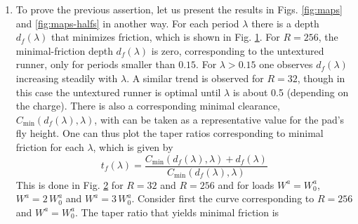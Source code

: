 \begin{enumerate}
Rayleigh step, which is optimal, has a slightly smaller taper ratio of 1.866) but also
for minimizing friction\cite{rahmani09}. 
\begin{figure}[h]
     \begin{center}
     {\scalebox{1.0}{}}
    \end{center}
\caption{Texture depth corresponding to minimal friction $d_f(\lambda)$
as a function of the period $\lambda$. Shown are numerical data 
corresponding to $R=32$ and $R=256$, in each case considering
loads $W^a=W^a_0$, $W^a=2\,W^a_0$ and $W^a=3\,W^a_0$.}  
\label{fig:dflambda}
\end{figure}
\begin{figure}[h]
     \begin{center}
     {\scalebox{1.0}{}}
    \end{center}
\caption{Taper ratio corresponding to minimal friction $t_f(\lambda)$
as a function of the period $\lambda$. Shown are numerical data 
corresponding to $R=32$ and $R=256$, in each case considering
loads $W^a=W^a_0$, $W^a=2\,W^a_0$ and $W^a=3\,W^a_0$.}  
\label{fig:tflambda}
\end{figure}
\item To prove the previous assertion, let us present
the results in Figs. \ref{fig:maps} and \ref{fig:maps-halfs} in
another way. For each period $\lambda$ there is a depth $d_f(\lambda)$
that minimizes friction, which is shown in Fig. \ref{fig:dflambda}.
For $R=256$, the minimal-friction depth $d_f(\lambda)$ is zero,
corresponding to the untextured runner, only for periods smaller
than $0.15$. For $\lambda > 0.15$ one observes $d_f(\lambda)$
increasing steadily with $\lambda$. A similar trend is observed
for $R=32$, though in this case the untextured runner is
optimal until $\lambda$ is about 0.5 (depending on the charge).
There is also a corresponding minimal clearance,
$C_{\min}(d_f(\lambda),\lambda)$, with can be taken as a representative
value for the pad's fly height. One can thus plot the taper ratios
corresponding to minimal friction for each $\lambda$, which
is given by
\begin{equation}
t_f(\lambda)=\frac{C_{\min}(d_f(\lambda),\lambda)+d_f(\lambda)}{C_{\min}(d_f(\lambda),\lambda)}
\label{eq:tflambda}
\end{equation}
This is done in Fig. \ref{fig:tflambda} for $R=32$ and $R=256$ and
for loads $W^a=W^a_0$, $W^a=2\,W^a_0$ and 
$W^a=3\,W^a_0$. Consider first the curve corresponding to $R=256$
and $W^a=W^a_0$. The taper ratio that yields minimal friction is

\end{enumerate}
